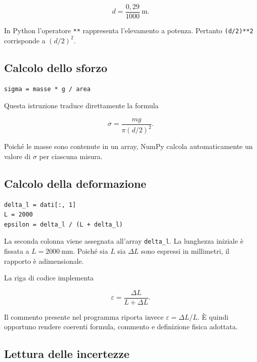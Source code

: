 \documentclass[11pt,a4paper]{book}
\begin{document}
\begin{equation}
    d=\frac{0{,}29}{1000}\ \si{\metre}.
\end{equation}

In Python l'operatore \texttt{**} rappresenta l'elevamento a potenza. Pertanto \texttt{(d/2)**2} corrisponde a $(d/2)^2$.

\subsection{Calcolo dello sforzo}

\begin{lstlisting}
sigma = masse * g / area
\end{lstlisting}

Questa istruzione traduce direttamente la formula

\begin{equation}
    \sigma=\frac{mg}{\pi(d/2)^2}.
\end{equation}

Poiché le masse sono contenute in un array, NumPy calcola automaticamente un valore di $\sigma$ per ciascuna misura.

\subsection{Calcolo della deformazione}

\begin{lstlisting}
delta_l = dati[:, 1]
L = 2000
epsilon = delta_l / (L + delta_l)
\end{lstlisting}

La seconda colonna viene assegnata all'array \texttt{delta\_l}. La lunghezza iniziale è fissata a $L=2000\ \si{\milli\metre}$. Poiché sia $L$ sia $\Delta L$ sono espressi in millimetri, il rapporto è adimensionale.

La riga di codice implementa

\begin{equation}
    \varepsilon=\frac{\Delta L}{L+\Delta L}.
\end{equation}

Il commento presente nel programma riporta invece $\varepsilon=\Delta L/L$. È quindi opportuno rendere coerenti formula, commento e definizione fisica adottata.

\subsection{Lettura delle incertezze}
\end{document}
